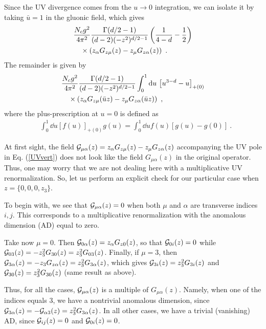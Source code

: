 Since the UV divergence comes from the \mbox{$u \to 0$} integration, we
can isolate it by taking $\bar u =1$ in the gluonic field, which gives
\begin{align}
&\frac{N_c g^2}{4\pi^2}
\frac{\Gamma(d/2-1)}{(d-2 )(-z^2)^{d/2-1}}
\left (\frac1{4-d}-\frac12 \right ) \nonumber \\  &\quad \times
\left(z_{\alpha} G_{z\mu}(z) - z_{\mu} G_{z\alpha}(z)\right) \ .
\label{UVvert}
\end{align}
The remainder is given by
\begin{align}
&\frac{N_c g^2}{4\pi^2}
\frac{\Gamma(d/2-1)}{(d-2 )(-z^2)^{d/2-1}}
\int_0^1 \mathrm{d} u\, \left[u^{3-d}-u\right]_{+(0)} \nonumber \\  &\quad \times
\left(z_{\alpha} G_{z\mu}( \bar uz) - z_{\mu} G_{z\alpha}(\bar uz)\right) \ ,
\label{UVvertreg}
\end{align}
where the plus-prescription at $u=0$ is defined as
\begin{align}
& \int_0^1 \dd u \left[f(u)\right]_{+(0)} g(u) = \int_0^1 \dd u f(u) [g(u) -g(0)] \ .
\label{plus0}
\end{align}

At first sight, the field ${\cal G}_{\mu\alpha}(z)=
z_{\alpha} G_{z\mu}( z) - z_{\mu} G_{z\alpha}(z)$
accompanying the UV pole in Eq. (\ref{UVvert}) does not look like
the field
$G_{\mu\alpha}(z)$ in the original operator.
Thus, one may worry that we are not dealing here with a
multiplicative UV renormalization.
So, let us perform an explicit check for our particular case when
$z= \{0,0,0,z_3 \}$.

To begin with, we see that ${\cal G}_{\mu\alpha}(z)=0$ when both $\mu$ and $\alpha$
are transverse indices $i,j$. This corresponds to a multiplicative renormalization
with the anomalous dimension (AD) equal to zero.

Take now
$\mu=0$. Then ${\cal G}_{0\alpha}(z)= z_{\alpha} G_{z 0}( z)$, so that
${\cal G}_{0 i}(z)= 0$ while ${\cal G}_{0 3}(z)= -z_3^2 G_{3 0}( z) = z_3^2 G_{0 3}( z)$.
Finally, if $\mu=3$, then ${\cal G}_{3\alpha}(z)= - z_{3} G_{z \alpha}( z) = z_3^2 G_{3 \alpha }( z)$,
which gives ${\cal G}_{3 i}(z)= z_3^2 G_{3 i}( z)$ and ${\cal G}_{3 0}(z)= z_3^2 G_{3 0}( z)$
(same result as above).

Thus, for all the cases, ${\cal G}_{\mu\alpha}(z)$ is a multiple of
${G}_{\mu\alpha}(z)$. Namely, when one of the
indices equals 3,
we have a nontrivial anomalous dimension, since
${\cal G}_{3\alpha}(z)=- {\cal G}_{\alpha 3}(z)= z_3^2 G_{3 \alpha}( z)$.
In all other cases, we have a trivial (vanishing) AD, since ${\cal G}_{ij}(z)=0$ and ${\cal G}_{0i}(z)=0$.

